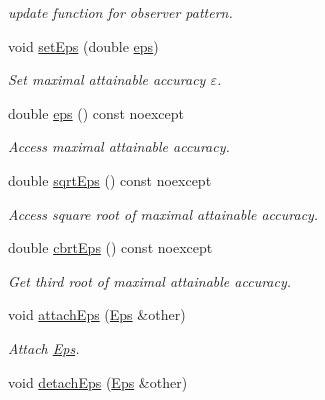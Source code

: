 \begin{DoxyCompactItemize}
\begin{DoxyCompactList}\small\item\em update function for observer pattern. \end{DoxyCompactList}\item 
void \hyperlink{classSpacy_1_1Mixin_1_1Eps_a1bbfd62541610d5d80f2782ab77158e4_a1bbfd62541610d5d80f2782ab77158e4}{set\+Eps} (double \hyperlink{classSpacy_1_1Mixin_1_1Eps_a40e2ba8f3abd2b5370ef41238cfaaf8b_a40e2ba8f3abd2b5370ef41238cfaaf8b}{eps})
\begin{DoxyCompactList}\small\item\em Set maximal attainable accuracy $\varepsilon$. \end{DoxyCompactList}\item 
double \hyperlink{classSpacy_1_1Mixin_1_1Eps_a40e2ba8f3abd2b5370ef41238cfaaf8b_a40e2ba8f3abd2b5370ef41238cfaaf8b}{eps} () const noexcept
\begin{DoxyCompactList}\small\item\em Access maximal attainable accuracy. \end{DoxyCompactList}\item 
double \hyperlink{classSpacy_1_1Mixin_1_1Eps_a29e8c25dc3f1fdede57b8eb06f520fe1_a29e8c25dc3f1fdede57b8eb06f520fe1}{sqrt\+Eps} () const noexcept
\begin{DoxyCompactList}\small\item\em Access square root of maximal attainable accuracy. \end{DoxyCompactList}\item 
double \hyperlink{classSpacy_1_1Mixin_1_1Eps_a1879ebbf1b467cb4be36bcc63307018d_a1879ebbf1b467cb4be36bcc63307018d}{cbrt\+Eps} () const noexcept
\begin{DoxyCompactList}\small\item\em Get third root of maximal attainable accuracy. \end{DoxyCompactList}\item 
void \hyperlink{classSpacy_1_1Mixin_1_1Eps_af69cd3dee52e723302b21ca2a25f1192_af69cd3dee52e723302b21ca2a25f1192}{attach\+Eps} (\hyperlink{classSpacy_1_1Mixin_1_1Eps_a51dbe0b9cc950e0f3dfd34a481f08ae4_a51dbe0b9cc950e0f3dfd34a481f08ae4}{Eps} \&other)
\begin{DoxyCompactList}\small\item\em Attach \hyperlink{classSpacy_1_1Mixin_1_1Eps}{Eps}. \end{DoxyCompactList}\item 
\hypertarget{classSpacy_1_1Mixin_1_1Eps_ab49910e189cb86b6fd6f89b6f2af14cc}{}void \hyperlink{classSpacy_1_1Mixin_1_1Eps_ab49910e189cb86b6fd6f89b6f2af14cc}{detach\+Eps} (\hyperlink{classSpacy_1_1Mixin_1_1Eps_a51dbe0b9cc950e0f3dfd34a481f08ae4_a51dbe0b9cc950e0f3dfd34a481f08ae4}{Eps} \&other)\label{classSpacy_1_1Mixin_1_1Eps_ab49910e189cb86b6fd6f89b6f2af14cc}


\end{DoxyCompactItemize}
